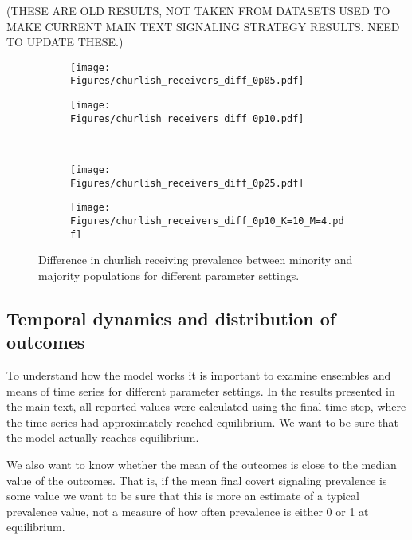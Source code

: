 \documentclass[11pt,letterpaper]{article}
\begin{document}
(THESE ARE OLD RESULTS, NOT TAKEN FROM DATASETS USED TO MAKE CURRENT MAIN
TEXT SIGNALING STRATEGY RESULTS. NEED TO UPDATE THESE.)

\begin{figure}[H]
  \centering
  \begin{subfigure}{0.48\textwidth}
    \centering
    \texttt{[image: Figures/churlish\_receivers\_diff\_0p05.pdf]}
  \end{subfigure}
  \hfill
  \begin{subfigure}{0.48\textwidth}
    \centering
    \texttt{[image: Figures/churlish\_receivers\_diff\_0p10.pdf]}
  \end{subfigure} \\[.25in]
  \begin{subfigure}{0.48\textwidth}
    \centering
    \texttt{[image: Figures/churlish\_receivers\_diff\_0p25.pdf]}
  \end{subfigure}
  \hfill
  \begin{subfigure}{0.48\textwidth}
    \centering
    \texttt{[image: Figures/churlish\_receivers\_diff\_0p10\_K=10\_M=4.pdf]}
  \end{subfigure}
  \caption{Difference in churlish receiving prevalence between minority and majority
  populations for different parameter settings.}
\end{figure}

\subsection{Temporal dynamics and distribution of outcomes}

To understand how the model works it is important to examine ensembles and
means of time series for different parameter settings. In the results presented
in the main text, all reported values were calculated using the final
time step, where the time series had approximately reached equilibrium.
We want to be sure that the model actually reaches equilibrium.

We also want to know whether the mean of the outcomes is close to the
median value of the outcomes. That is, if the mean
final covert signaling prevalence is some value we want to be sure that
this is more an estimate of a typical prevalence value, not a measure of 
how often prevalence is either 0 or 1 at equilibrium.
\end{document}
